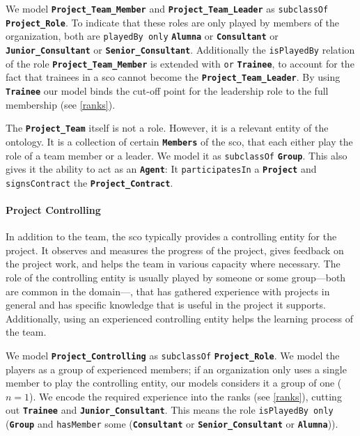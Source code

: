 \documentclass[a4paper, DIV=13, BCOR=0cm]{scrbook}
\newcommand{\class}[1]{\texttt{\textbf{#1}}}
\newcommand{\relation}[1]{\texttt{#1}}
\begin{document}
We model \class{Project\_Team\_Member} and \class{Project\_Team\_Leader} as \relation{subclassOf} \class{Project\_Role}. To indicate that these roles are only played by members of the organization, both are \relation{playedBy only} \class{Alumna} or \class{Consultant} or \class{Junior\_Consultant} or \class{Senior\_Consultant}. Additionally the \relation{isPlayedBy} relation of the role \class{Project\_Team\_Member} is extended with \relation{or} \class{Trainee}, to account for the fact that trainees in a \gls{sco} cannot become the \class{Project\_Team\_Leader}. By using \class{Trainee} our model binds the cut-off point for the leadership role to the full membership (see \ref{ranks}).

The \class{Project\_Team} itself is not a role. However, it is a relevant entity of the ontology. It is a collection of certain \class{Members} of the \gls{sco}, that each either play the role of a team member or a leader. We model it as \relation{subclassOf} \class{Group}. This also gives it the ability to act as an \class{Agent}: It \relation{participatesIn} a \class{Project} and \relation{signsContract} the \class{Project\_Contract}.

\paragraph{Project Controlling}
In addition to the team, the \gls{sco} typically provides a controlling entity for the project. It observes and measures the progress of the project, gives feedback on the project work, and helps the team in various capacity where necessary. The role of the controlling entity is usually played by someone or some group---both are common in the domain---, that has gathered experience with projects in general and has specific knowledge that is useful in the project it supports. Additionally, using an experienced controlling entity helps the learning process of the team.

We model \class{Project\_Controlling} as \relation{subclassOf} \class{Project\_Role}. We model the players as a group of experienced members; if an organization only uses a single member to play the controlling entity, our models considers it a group of one ($n = 1$). We encode the required experience into the ranks (see \ref{ranks}), cutting out \class{Trainee} and \class{Junior\_Consultant}. This means the role \relation{isPlayedBy only} (\class{Group} and \relation{hasMember} some (\class{Consultant} or \class{Senior\_Consultant} or \class{Alumna})).
\end{document}
